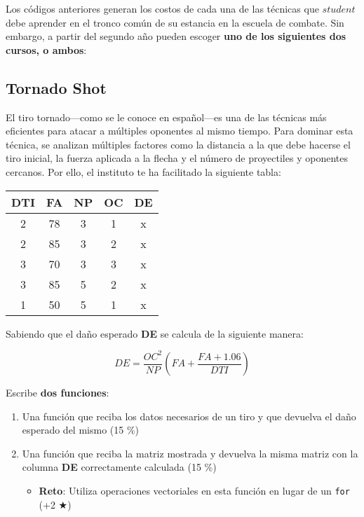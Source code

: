 \documentclass[11pt]{article}
\newcommand{\matlab}[1]{\lstinline[style=Matlab-editor]!#1!}
\begin{document}
Los códigos anteriores generan los costos de cada una de las técnicas que $student$ debe aprender en el tronco común de su estancia en la escuela de combate.
Sin embargo, a partir del segundo año pueden escoger \textbf{uno de los siguientes dos cursos, o ambos}:

\subsection{Tornado Shot}

El tiro tornado---como se le conoce en español---es una de las técnicas más eficientes para atacar a múltiples oponentes al mismo tiempo.
Para dominar esta técnica, se analizan múltiples factores como la distancia a la que debe hacerse el tiro inicial, la fuerza aplicada a la flecha y el número de proyectiles y oponentes cercanos. Por ello, el instituto te ha facilitado la siguiente tabla:

\begin{table}[htbp]
    \centering
    \begin{tabular}{@{}ccccc@{}}
    \toprule
    \textbf{DTI} & \textbf{FA} & \textbf{NP} & \textbf{OC} & \textbf{DE} \\ \midrule
    2 & 78 & 3 & 1 & x\\
    2 & 85 & 3 & 2 & x\\
    3 & 70 & 3 & 3 & x\\
    3 & 85 & 5 & 2 & x\\
    1 & 50 & 5 & 1 & x\\ \bottomrule
    \end{tabular}
\end{table}

Sabiendo que el daño esperado \textbf{DE} se calcula de la siguiente manera:

$$DE = \frac{OC^2}{NP} \left(FA + \frac{FA + 1.06}{DTI} \right)$$

\bigskip

Escribe \textbf{dos funciones}:
\begin{enumerate}
    \item Una función que reciba los datos necesarios de un tiro y que devuelva el daño esperado del mismo (15 \%)
    \item Una función que reciba la matriz mostrada y devuelva la misma matriz con la columna \textbf{DE} correctamente calculada (15 \%)
    \begin{itemize}
        \item \textbf{Reto}: Utiliza operaciones vectoriales en esta función en lugar de un \matlab{for} (+2 $\bigstar$)
    \end{itemize}
\end{enumerate}
\end{document}
